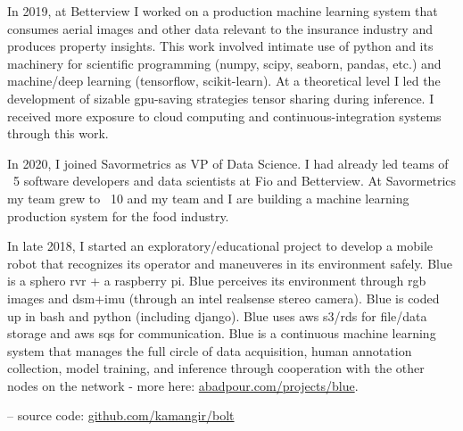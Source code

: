 \osspacing
In 2019, at Betterview I worked on a production machine learning system that consumes aerial images and other data relevant to the insurance industry and produces property insights. This work involved intimate use of python and its machinery for scientific programming (numpy, scipy, seaborn, pandas, etc.) and machine/deep learning (tensorflow, scikit-learn). At a theoretical level I led the development of sizable gpu-saving strategies tensor sharing during inference. I received more exposure to cloud computing and continuous-integration systems through this work.

\osspacing
In 2020, I joined Savormetrics as VP of Data Science. I had already led teams of ~5 software developers and data scientists at Fio and Betterview. At Savormetrics my team grew to ~10 and my team and I are building a machine learning production system for the food industry.

\osspacing
In late 2018, I started an exploratory/educational project to develop a mobile robot that recognizes its operator and maneuveres in its environment safely. Blue is a sphero rvr + a raspberry pi. Blue perceives its environment through rgb images and dsm+imu (through an intel realsense stereo camera). Blue is coded up in bash and python (including django). Blue uses aws s3/rds for file/data storage and aws sqs for communication. Blue is a continuous machine learning system that manages the full circle of data acquisition, human annotation collection, model training, and inference through cooperation with the other nodes on the network - more here: \href{http://abadpour.com/projects/blue}{abadpour.com/projects/blue}.

\osspacing
-- source code: \href{https://github.com/kamangir/bolt}{github.com/kamangir/bolt}

